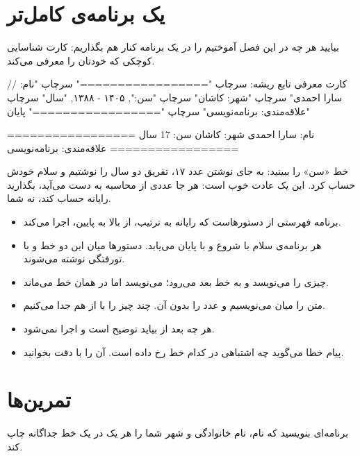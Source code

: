\section{یک برنامه‌ی کامل‌تر}

بیایید هر چه در این فصل آموختیم را در یک برنامه کنار هم بگذاریم: کارت
شناسایی کوچکی که خودتان را معرفی می‌کند.

\begin{salamfa}
// کارت معرفی
تابع ریشه:
    سرچاپ "================="
    سرچاپ "نام: سارا احمدی"
    سرچاپ "شهر: کاشان"
    سرچاپ "سن:", ۱۴۰۵ - ۱۳۸۸, "سال"
    سرچاپ "علاقه‌مندی: برنامه‌نویسی"
    سرچاپ "================="
پایان
\end{salamfa}

\begin{outputfa}
=================
نام: سارا احمدی
شهر: کاشان
سن: 17 سال
علاقه‌مندی: برنامه‌نویسی
=================
\end{outputfa}

خط «سن» را ببینید: به جای نوشتن عدد ۱۷، تفریق دو سال را نوشتیم و سلام خودش
حساب کرد. این یک عادت خوب است: هر جا عددی از محاسبه به دست می‌آید، بگذارید
رایانه حساب کند، نه شما.

\begin{summary}
\begin{itemize}
  \item برنامه فهرستی از دستورهاست که رایانه به ترتیب، از بالا به پایین،
        اجرا می‌کند.
  \item هر برنامه‌ی سلام با  شروع و با 
        پایان می‌یابد. دستورها میان این دو خط و با تورفتگی نوشته می‌شوند.
  \item {} چیزی را می‌نویسد و به خط بعد می‌رود؛ 
        می‌نویسد اما در همان خط می‌ماند.
  \item متن را میان  می‌نویسیم و عدد را بدون آن. چند چیز را با
        \code{,} از هم جدا می‌کنیم.
  \item هر چه بعد از \code{//} بیاید توضیح است و اجرا نمی‌شود.
  \item پیام خطا می‌گوید چه اشتباهی در کدام خط رخ داده است. آن را با دقت
        بخوانید.
\end{itemize}
\end{summary}

\section*{تمرین‌ها}

\exercise برنامه‌ای بنویسید که نام، نام خانوادگی و شهر شما را هر یک در یک
خط جداگانه چاپ کند.

